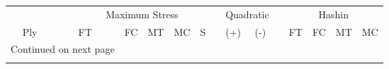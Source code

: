 \begin{table}[H]
\centering
\begin{longtable}{@{}rllllllllllllll@{}}
\toprule       
 & \phantom{a} &\multicolumn{5}{c}{Maximum Stress} & \phantom{a} & \multicolumn{2}{c}{Quadratic} & 
\phantom{a} & \multicolumn{4}{c}{Hashin}\\
\cmidrule{3-7} \cmidrule{9-10} \cmidrule{12-15}
  
         \multicolumn{1}{c}{Ply} &&  FT &  FC &  MT &  MC &      S &&  (+) &   (-) &&  FT &  FC &  MT &  MC \\
\midrule
\endhead
\midrule
\multicolumn{3}{r}{{Continued on next page}} \\
\midrule
\endfoot


\end{longtable}
\end{table}
